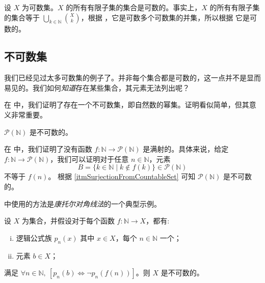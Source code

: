 \begin{example}
\label{exCountableSubsetsOfCountableSetIsCountable}
设 $X$ 为可数集。$X$ 的所有有限子集的集合是可数的。事实上，$X$ 的所有有限子集的集合等于 $\displaystyle \bigcup_{k \in \mathbb{N}} \binom{X}{k}$，根据 ，它是可数多个可数集的并集，所以根据  它是可数的。
\end{example}

\subsection*{不可数集}

我们已经见过太多可数集的例子了。并非每个集合都是可数的，这一点并不是显而易见的。我们如何\textit{知道}存在某些集合，其元素无法列出呢？

在  中，我们证明了存在一个不可数集，即自然数的幂集。证明看似简单，但其意义非常重要。

\begin{theorem}
\label{thmCantorForN}
$\mathcal{P}(\mathbb{N})$ 是不可数的。
\end{theorem}

\begin{cproof}
在  中，我们证明了没有函数 $f : \mathbb{N} \to \mathcal{P}(\mathbb{N})$ 是满射的。具体来说，给定 $f : \mathbb{N} \to \mathcal{P}(\mathbb{N})$，我们可以证明对于任意 $n \in \mathbb{N}$，元素
\[ B = \{ k \in \mathbb{N} \mid k \not\in f(k) \} \in \mathcal{P}(\mathbb{N}) \]
不等于 $f(n)$。 根据 \ref{itmSurjectionFromCountableSet} 可知 $\mathcal{P}(\mathbb{N})$ 是不可数的。
\end{cproof}

 中使用的方法是\textit{康托尔对角线法}的一个典型示例。

\begin{theorem}
\label{thmCantorDiagonalGeneral}
设 $X$ 为集合，并假设对于每个函数 $f : \mathbb{N} \to X$，都有:
\begin{enumerate}[(i)]
\item 逻辑公式族 $p_n(x)$ 其中 $x \in X$，每个 $n \in \mathbb{N}$ 一个；
\item 元素 $b \in X$；
\end{enumerate}
满足 $\forall n \in \mathbb{N},~ [p_n(b) \Leftrightarrow \neg p_n(f(n))]$。则 $X$ 是不可数的。
\end{theorem}

